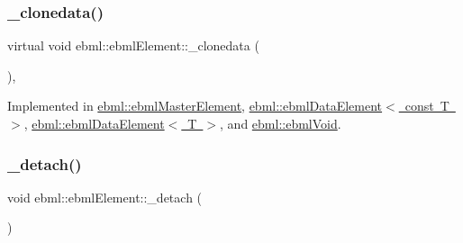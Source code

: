 \mbox{\label{classebml_1_1ebmlElement_a3ebe3aa75b62971f385c01f27c807a02}} 
\subsubsection{\texorpdfstring{\+\_\+clonedata()}{\_clonedata()}}
{\footnotesize\ttfamily virtual void ebml\+::ebml\+Element\+::\+\_\+clonedata (\begin{DoxyParamCaption}\item[{const \mbox{\hyperlink{classebml_1_1ebmlElement}{ebml\+Element}} $\ast$}]{ }\end{DoxyParamCaption})\hspace{0.3cm}{\ttfamily [protected]}, {}}



Implemented in \mbox{\hyperlink{classebml_1_1ebmlMasterElement_a9bde42f70ab39592c4dccb6bf04904d4}{ebml\+::ebml\+Master\+Element}}, \mbox{\hyperlink{classebml_1_1ebmlDataElement_3_01const_01T_01_4_a46a152b21a6fc49a331e61f29c486ebe}{ebml\+::ebml\+Data\+Element$<$ const T $>$}}, \mbox{\hyperlink{classebml_1_1ebmlDataElement_abc9e99cdc566a08b2334e55374dc5f5a}{ebml\+::ebml\+Data\+Element$<$ T $>$}}, and \mbox{\hyperlink{classebml_1_1ebmlVoid_a1319a15cbec91a7f52763c30d7fa3a18}{ebml\+::ebml\+Void}}.

\mbox{\label{classebml_1_1ebmlElement_ac567afa28f18f9327299d47b1ab64550}} 
\subsubsection{\texorpdfstring{\+\_\+detach()}{\_detach()}}
{\footnotesize\ttfamily void ebml\+::ebml\+Element\+::\+\_\+detach (\begin{DoxyParamCaption}{ }\end{DoxyParamCaption})\hspace{0.3cm}{\ttfamily [protected]}}

\mbox{\label{classebml_1_1ebmlElement_ae2e24c1aa8ef7bd93c1ec64573afaff1}} 
